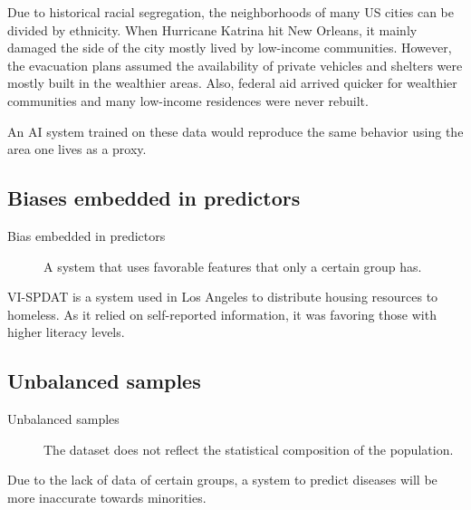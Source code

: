 \begin{example}
    Due to historical racial segregation, the neighborhoods of many US cities can be divided by ethnicity. When Hurricane Katrina hit New Orleans, it mainly damaged the side of the city mostly lived by low-income communities. However, the evacuation plans assumed the availability of private vehicles and shelters were mostly built in the wealthier areas. Also, federal aid arrived quicker for wealthier communities and many low-income residences were never rebuilt.

    An AI system trained on these data would reproduce the same behavior using the area one lives as a proxy.
\end{example}


\subsection{Biases embedded in predictors}

\begin{description}
    \item[Bias embedded in predictors] 
        A system that uses favorable features that only a certain group has.
\end{description}

\begin{example}
    VI-SPDAT is a system used in Los Angeles to distribute housing resources to homeless. As it relied on self-reported information, it was favoring those with higher literacy levels.
\end{example}


\subsection{Unbalanced samples}

\begin{description}
    \item[Unbalanced samples] 
        The dataset does not reflect the statistical composition of the population.
\end{description}

\begin{example}
    Due to the lack of data of certain groups, a system to predict diseases will be more inaccurate towards minorities.
\end{example}



